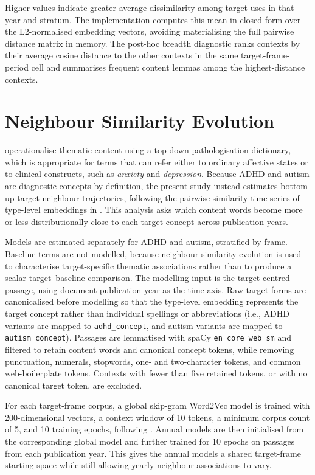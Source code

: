 \noindent Higher values indicate greater average dissimilarity among target uses in that year and stratum. The implementation computes this mean in closed form over the L2-normalised embedding vectors, avoiding materialising the full pairwise distance matrix in memory. The post-hoc breadth diagnostic ranks contexts by their average cosine distance to the other contexts in the same target-frame-period cell and summarises frequent content lemmas among the highest-distance contexts.

\section{Neighbour Similarity Evolution}

\citet{baesMultidimensionalFrameworkEvaluating2024} operationalise thematic content using a top-down pathologisation dictionary, which is appropriate for terms that can refer either to ordinary affective states or to clinical constructs, such as \textit{anxiety} and \textit{depression}. Because ADHD and autism are diagnostic concepts by definition, the present study instead estimates bottom-up target-neighbour trajectories, following the pairwise similarity time-series of type-level embeddings in \citet{vylomovaSemanticChangesHarmrelated2021}. This analysis asks which content words become more or less distributionally close to each target concept across publication years.

Models are estimated separately for ADHD and autism, stratified by frame. Baseline terms are not modelled, because neighbour similarity evolution is used to characterise target-specific thematic associations rather than to produce a scalar target--baseline comparison. The modelling input is the target-centred passage, using document publication year as the time axis. Raw target forms are canonicalised before modelling so that the type-level embedding represents the target concept rather than individual spellings or abbreviations (i.e., ADHD variants are mapped to \texttt{adhd\_concept}, and autism variants are mapped to \texttt{autism\_concept}). Passages are lemmatised with spaCy \texttt{en\_core\_web\_sm} and filtered to retain content words and canonical concept tokens, while removing punctuation, numerals, stopwords, one- and two-character tokens, and common web-boilerplate tokens. Contexts with fewer than five retained tokens, or with no canonical target token, are excluded.

For each target-frame corpus, a global skip-gram Word2Vec model is trained with 200-dimensional vectors, a context window of 10 tokens, a minimum corpus count of 5, and 10 training epochs, following \citet{vylomovaSemanticChangesHarmrelated2021}. Annual models are then initialised from the corresponding global model and further trained for 10 epochs on passages from each publication year. This gives the annual models a shared target-frame starting space while still allowing yearly neighbour associations to vary.

